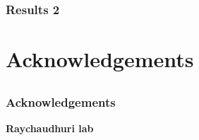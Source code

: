 \documentclass[pdf, usepdftitle=false]{beamer}
\begin{document}
\begin{frame}
\frametitle{Results 2}

\end{frame}

\section{Acknowledgements}
\subsection{}
\begin{frame}
\frametitle{Acknowledgements} 

\vspace{1.5cm}


\centering
\textbf{Raychaudhuri lab}\\
\vspace{1.5cm}


\end{frame}
\end{document}

